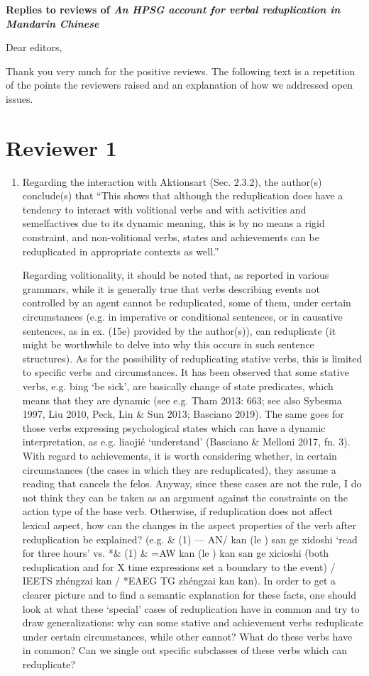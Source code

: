\documentclass[fleqn,twoside]{article}
\begin{document}
\noindent
{\large\bf Replies to reviews of \emph{An HPSG account for verbal reduplication in Mandarin Chinese}}

\noindent
Dear editors,

Thank you very much for the positive reviews. The following text is a repetition of the points the
reviewers raised and an explanation of how we addressed open issues.

\section{Reviewer 1}

\begin{enumerate}
\item
Regarding the interaction with Aktionsart (Sec. 2.3.2), the author(s) conclude(s) that ``This shows
that although the reduplication does have a tendency to interact with volitional verbs and with
activities and semelfactives due to its dynamic meaning, this is by no means a rigid constraint, and
non-volitional verbs, states and achievements can be reduplicated in appropriate contexts as well.''

Regarding volitionality, it should be noted that, as reported in various grammars, while it is generally true that verbs describing events not controlled by an agent cannot be reduplicated, some of them, under certain circumstances (e.g. in imperative or conditional sentences, or in causative  sentences, as in ex. (15e) provided by the author(s)), can reduplicate (it might be worthwhile to delve into why this occurs in such sentence structures). As for the possibility of reduplicating stative verbs, this is limited to specific verbs and circumstances. It has been observed that some stative verbs, e.g. bing ‘be sick’, are basically change of state predicates, which means that they are dynamic (see e.g. Tham 2013: 663; see also Sybesma 1997, Liu 2010, Peck, Lin \& Sun 2013; Basciano 2019). The same goes for those verbs expressing psychological states which can have a dynamic interpretation, as e.g. liaojié `understand' (Basciano \& Melloni 2017, fn. 3). With regard to achievements, it is worth considering whether, in certain circumstances (the cases in which they are reduplicated), they assume a reading that cancels the felos. Anyway, since these cases are not the rule, I do not think they can be taken as an argument against the constraints on the action type of the base verb. Otherwise, if reduplication does not affect lexical aspect, how can the changes in the aspect properties of the verb after reduplication be explained? (e.g. \& (1) — AN/ kan (le ) san ge xidoshi ‘read for three hours’ vs. *\& (1) \& =AW kan (le ) kan san ge xicioshi (both reduplication and for X time expressions set a boundary to the event) / IEETS zhéngzai kan / *EAEG TG zhéngzai kan kan). In order to get a clearer picture and to find a semantic explanation for these facts, one should look at what these ‘special’ cases of reduplication have in common and try to draw generalizations: why can some stative and achievement verbs reduplicate under certain circumstances, while other cannot? What do these verbs have in common? Can we single out specific subclasses of these verbs which can reduplicate?


\end{enumerate}
\end{document}
